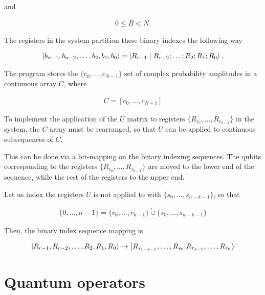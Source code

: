 and

\begin{align*}
0\leq{}B<N. 
\end{align*}

The registers in the system partition these binary indexes the following way

\begin{align*}
\ket{b_{n-1},b_{n-2},\dots{},b_2,b_1,b_0} = \ket{R_{r-1} \hspace{1mm}|\hspace{1mm} R_{r-2}; \dots{}; R_2; R_1; R_0}.
\end{align*}

The program stores the $\{c_0,\dots{},c_{N-1}\}$ set of complex probability amplitudes in a continuous array $C$, where

\begin{align*}
C = [c_0,\dots{},c_{N-1}]
\end{align*}

To implement the application of the $U$ matrix to registers $\{R_{r_0},\dots{},R_{r_{k-1}}\}$ in the system, the $C$ array must be rearranged, so that $U$ can be applied to continuous subsequences of $C$.

This can be done via a bit-mapping on the binary indexing sequences. The qubits corresponding to the registers $\{R_{r_0},\dots{},R_{r_{k-1}}\}$ are moved to the lower end of the sequence, while the rest of the registers to the upper end.

Let us index the registers $U$ is not applied to with $\{s_0, \dots{}, s_{n-k-1}\}$, so that

\begin{align*}
\{0, \dots{}, n-1\} = \{r_0, \dots{}, r_{k-1}\} \dot{\cup} \{s_0, \dots{}, s_{n-k-1}\} 
\end{align*}

Then, the binary index sequence mapping is

\begin{align*}
\ket{R_{r-1}, R_{r-2}, \dots{}, R_2, R_1, R_0} \rightarrow \ket{R_{s_{r-k-1}}, \dots{}, R_{s_0} | R_{r_{k-1}}, \dots{}, R_{r_0} }
\end{align*}

\section{Quantum operators}
